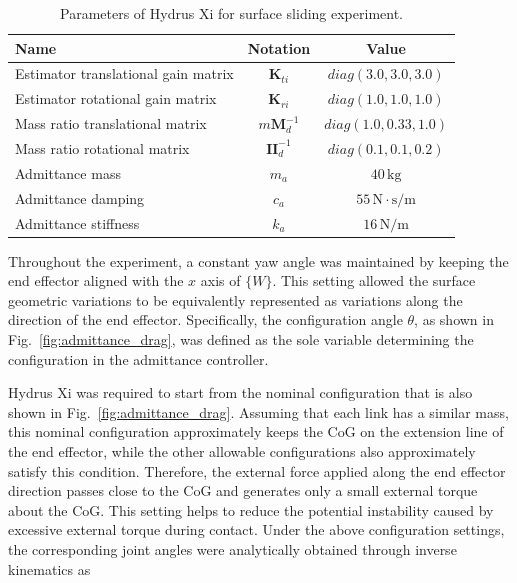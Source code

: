 \begin{table}[H]
    \centering
    \caption{Parameters of Hydrus Xi for surface sliding experiment.}
    \label{tb:params4}
    \begin{tabular}{lcc}
        \hline
        Name & Notation & Value \\
        \hline
        Estimator translational gain matrix & $\boldsymbol{K}_{ti}$ & $diag(3.0, 3.0, 3.0)$ \\
        Estimator rotational gain matrix & $\boldsymbol{K}_{ri}$ & $diag(1.0, 1.0, 1.0)$ \\
        Mass ratio translational matrix & $m\boldsymbol{M}_d^{-1}$ & $diag(1.0, 0.33, 1.0)$ \\
        Mass ratio rotational matrix & $\boldsymbol{I}\boldsymbol{I}_d^{-1}$ & $diag(0.1, 0.1, 0.2)$ \\
        Admittance mass & $m_a$ & $40\,\mathrm{kg}$ \\
        Admittance damping & $c_a$ & $55\,\mathrm{N\cdot s/m}$ \\
        Admittance stiffness & $k_a$ & $16\,\mathrm{N/m}$ \\
        \hline
    \end{tabular}
\end{table}

Throughout the experiment, a constant yaw angle was maintained by keeping the end effector aligned with the $x$ axis of $\{W\}$. This setting allowed the surface geometric variations to be equivalently represented as variations along the direction of the end effector. Specifically, the configuration angle $\theta$, as shown in Fig.~\ref{fig:admittance_drag}, was defined as the sole variable determining the configuration in the admittance controller.

Hydrus Xi was required to start from the nominal configuration that is also shown in Fig.~\ref{fig:admittance_drag}. Assuming that each link has a similar mass, this nominal configuration approximately keeps the CoG on the extension line of the end effector, while the other allowable configurations also approximately satisfy this condition. Therefore, the external force applied along the end effector direction passes close to the CoG and generates only a small external torque about the CoG. This setting helps to reduce the potential instability caused by excessive external torque during contact. Under the above configuration settings, the corresponding joint angles were analytically obtained through inverse kinematics as

